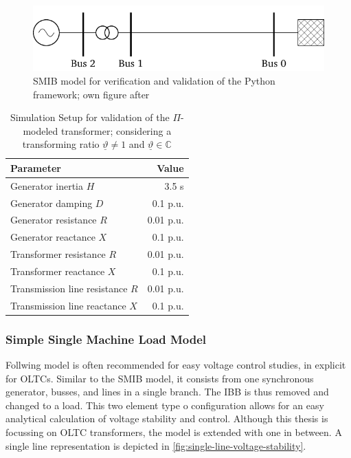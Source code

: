 \begin{figure}[htb]
    \centering
    \includegraphics{tikz_graphics/images/smib_model.pdf}
    \caption[]{\acf{SMIB} model for verification and validation of the Python framework; own figure after \autocite{machowskiPowerSystemDynamics2020,kundurPowerSystemStability2022}}
    \label{fig:smib-model}
\end{figure}

\begin{table}[htb]
    \caption[Simulation Setup for validation of the $\Pi$-modeled transformer]{Simulation Setup for validation of the $\Pi$-modeled transformer; considering a transforming ratio $\underline{\vartheta} \neq 1$ and $\underline{\vartheta} \in \mathbb{C}$}
    \label{tab:smib-model}
    \vspace*{12pt}
    \centering
    \small
    \begin{tabularx}{\textwidth}{Xr}
        \textbf{Parameter} & \textbf{Value} \\ \hline
        \toprule
        Generator inertia $H$ & 3.5 s \\
        Generator damping $D$ & 0.1 p.u. \\
        Generator resistance $R$ & 0.01 p.u. \\
        Generator reactance $X$ & 0.1 p.u. \\
        Transformer resistance $R$ & 0.01 p.u. \\
        Transformer reactance $X$ & 0.1 p.u. \\
        Transmission line resistance $R$ & 0.01 p.u. \\
        Transmission line reactance $X$ & 0.1 p.u. \\
        \bottomrule
    \end{tabularx}
\end{table}

\subsubsection{Simple Single Machine Load Model}

Follwing model is often recommended \quelle for easy voltage control studies, in explicit for \acsp{OLTC}. Similar to the \acs{SMIB} model, it consists from one synchronous generator, busses, and lines in a single branch. The \acs{IBB} is thus removed and changed to a load. This two element type o configuration allows for an easy analytical calculation of voltage stability and control. Although this thesis is focussing on \acs{OLTC} transformers, the model is extended with one in between. A single line representation is depicted in \autoref{fig:single-line-voltage-stability}.

